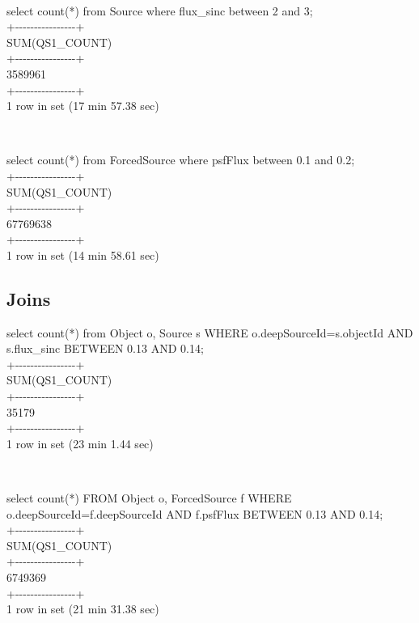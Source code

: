 \documentclass[DM,toc]{lsstdoc}
\begin{document}
~

select count(*) from Source where flux\_sinc between 2 and 3;\\
+-\/-\/-\/-\/-\/-\/-\/-\/-\/-\/-\/-\/-\/-\/-\/-+\\
\textbar{} SUM(QS1\_COUNT) \textbar{}\\
+-\/-\/-\/-\/-\/-\/-\/-\/-\/-\/-\/-\/-\/-\/-\/-+\\
\textbar{} 3589961 \textbar{}\\
+-\/-\/-\/-\/-\/-\/-\/-\/-\/-\/-\/-\/-\/-\/-\/-+\\
1 row in set (17 min 57.38 sec)

~

select count(*) from ForcedSource where psfFlux between 0.1 and 0.2;\\
+-\/-\/-\/-\/-\/-\/-\/-\/-\/-\/-\/-\/-\/-\/-\/-+\\
\textbar{} SUM(QS1\_COUNT) \textbar{}\\
+-\/-\/-\/-\/-\/-\/-\/-\/-\/-\/-\/-\/-\/-\/-\/-+\\
\textbar{} 67769638 \textbar{}\\
+-\/-\/-\/-\/-\/-\/-\/-\/-\/-\/-\/-\/-\/-\/-\/-+\\
1 row in set (14 min 58.61 sec)

\subsection{Joins}\label{joins}

select count(*) from Object o, Source s WHERE o.deepSourceId=s.objectId
AND s.flux\_sinc BETWEEN 0.13 AND 0.14;\\
+-\/-\/-\/-\/-\/-\/-\/-\/-\/-\/-\/-\/-\/-\/-\/-+\\
\textbar{} SUM(QS1\_COUNT) \textbar{}\\
+-\/-\/-\/-\/-\/-\/-\/-\/-\/-\/-\/-\/-\/-\/-\/-+\\
\textbar{} 35179 \textbar{}\\
+-\/-\/-\/-\/-\/-\/-\/-\/-\/-\/-\/-\/-\/-\/-\/-+\\
1 row in set (23 min 1.44 sec)

~

select count(*) FROM Object o, ForcedSource f WHERE
o.deepSourceId=f.deepSourceId AND f.psfFlux BETWEEN 0.13 AND 0.14;\\
+-\/-\/-\/-\/-\/-\/-\/-\/-\/-\/-\/-\/-\/-\/-\/-+\\
\textbar{} SUM(QS1\_COUNT) \textbar{}\\
+-\/-\/-\/-\/-\/-\/-\/-\/-\/-\/-\/-\/-\/-\/-\/-+\\
\textbar{} 6749369 \textbar{}\\
+-\/-\/-\/-\/-\/-\/-\/-\/-\/-\/-\/-\/-\/-\/-\/-+\\
1 row in set (21 min 31.38 sec)
\end{document}
